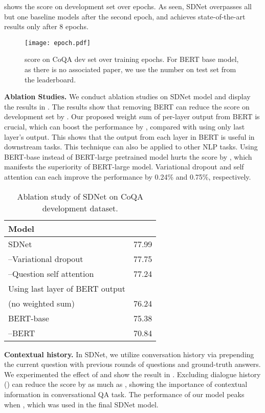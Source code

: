 \documentclass{article} \usepackage{sdnet,times}
\begin{document}
 shows the  score on development set over epochs. As seen, SDNet overpasses all but one baseline models after the second epoch, and achieves state-of-the-art results only after 8 epochs.  

\begin{figure*}[t]
\centering
\texttt{[image: epoch.pdf]}
\vspace{-1\baselineskip}
\caption{ score on CoQA dev set over training epochs. For BERT base model, as there is no associated paper, we use the number on test set from the leaderboard.}
\label{fig:epoch}
\end{figure*}

\textbf{Ablation Studies.} We conduct ablation studies on SDNet model and display the results in . The results show that removing BERT can reduce the  score on development set by . Our proposed weight sum of per-layer output from BERT is crucial, which can boost the performance by , compared with using only last layer's output. This shows that the output from each layer in BERT is useful in downstream tasks. This technique can also be applied to other NLP tasks. Using BERT-base instead of BERT-large pretrained model hurts the  score by , which manifests the superiority of BERT-large model. Variational dropout and self attention can each improve the performance by 0.24\% and 0.75\%, respectively.


\begin{table}[t]
\centering
\caption{Ablation study of SDNet on CoQA development dataset.}
\label{table:ablation}
\begin{tabular}{lc}
\toprule
Model &  \\ 
\midrule
\midrule
SDNet & 77.99 \\
\quad --Variational dropout & 77.75 \\
\quad --Question self attention & 77.24 \\
\quad Using last layer of BERT output &  \\
\quad (no weighted sum) & 76.24 \\
\quad BERT-base & 75.38 \\
\quad --BERT & 70.84 \\
\bottomrule
\end{tabular}
\end{table}

\textbf{Contextual history.} In SDNet, we utilize conversation history via prepending the current question with previous  rounds of questions and ground-truth answers. We experimented the effect of  and show the result in . Excluding dialogue history () can reduce the  score by as much as , showing the importance of contextual information in conversational QA task.
The performance of our model peaks when , which was used in the final SDNet model.
\end{document}
